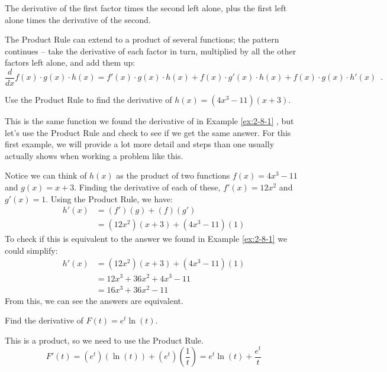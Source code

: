 The derivative of the first factor times the second left alone, plus the first left alone times the derivative of the second.

The Product Rule can extend to a product of several functions; the pattern continues -- take the derivative of each factor in turn, multiplied by all the other factors left alone, and add them up:
$$\dfrac{d}{dx} f(x)\cdot g(x)\cdot h(x) = f'(x)\cdot g(x)\cdot h(x)+f(x)\cdot g'(x)\cdot h(x)+f(x)\cdot g(x)\cdot h'(x) \enspace .$$


\begin{example}
Use the Product Rule to find the derivative of $h(x)=(4x^3-11)(x+3)$.

\begin{solution} This is the same function we found the derivative of in Example \ref{ex:2-8-1} , but let's use the Product Rule and check to see if we get the same answer. For this first example, we will provide a lot more detail and steps than one usually actually shows when working a problem like this.

Notice we can think of $h(x)$ as the product of two functions $f(x)=4x^3-11$ and $g(x)=x+3$. Finding the derivative of each of these,
$f'(x)=12x^2$ and $g'(x)=1$.
Using the Product Rule, we have: 
\begin{align*}
		h'(x) &= (f')(g)+(f)(g') \\
		 &= \left(12x^2\right)(x+3)+\left(4x^3-11\right)(1)
	\end{align*}
To check if this is equivalent to the answer we found in Example \ref{ex:2-8-1}  we could simplify:
\begin{align*}
		h'(x) &= \left(12x^2\right)(x+3)+\left(4x^3-11\right)(1) \\
		 &= 12x^3+36x^2+4x^3-11 \\
		 &= 16x^3+36x^2-11
	\end{align*}
From this, we can see the answers are equivalent.
\end{solution}\end{example}



\begin{example}
Find the derivative of $ F(t)=e^t\ln(t) $.

\begin{solution} This is a product, so we need to use the Product Rule. 
$$F'(t)=\left(e^t\right)\left(\ln(t)\right)+\left(e^t\right)\left(\dfrac{1}{t}\right)=e^t\ln(t)+\dfrac{e^t}{t}$$
\end{solution}\end{example}

